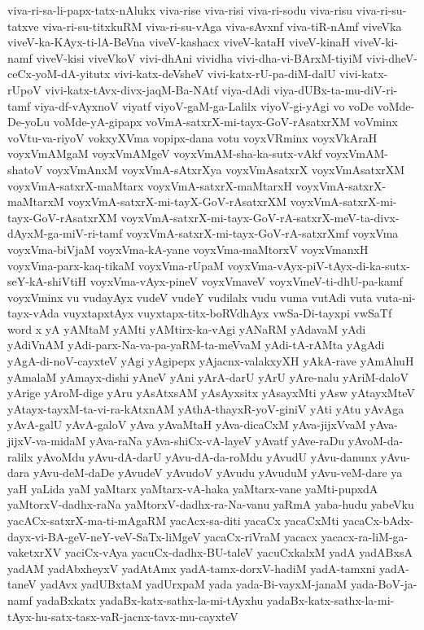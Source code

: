 {viva-ri-sa-li-papx-tatx-nAlukx
viva-rise
viva-risi
viva-ri-sodu
viva-risu
viva-ri-su-tatxve
viva-ri-su-titxkuRM
viva-ri-su-vAga
viva-sAvxnf
viva-tiR-nAmf
viveVka
viveV-ka-KAyx-ti-lA-BeVna
viveV-kashacx
viveV-kataH
viveV-kinaH
viveV-ki-namf
viveV-kisi
viveVkoV
vivi-dhAni
vividha
vivi-dha-vi-BArxM-tiyiM
vivi-dheV-ceCx-yoM-dA-yitutx
vivi-katx-deVsheV
vivi-katx-rU-pa-diM-dalU
vivi-katx-rUpoV
vivi-katx-tAvx-divx-jaqM-Ba-NAtf
viya-dAdi
viya-dUBx-ta-mu-diV-ri-tamf
viya-df-vAyxnoV
viyatf
viyoV-gaM-ga-Lalilx
viyoV-gi-yAgi
vo
voDe
voMde-De-yoLu
voMde-yA-gipapx
voVmA-satxrX-mi-tayx-GoV-rAsatxrXM
voVminx
voVtu-va-riyoV
vokxyXVma
vopipx-dana
votu
voyxVRminx
voyxVkAraH
voyxVmAMgaM
voyxVmAMgeV
voyxVmAM-sha-ka-sutx-vAkf
voyxVmAM-shatoV
voyxVmAnxM
voyxVmA-sAtxrXya
voyxVmAsatxrX
voyxVmAsatxrXM
voyxVmA-satxrX-maMtarx
voyxVmA-satxrX-maMtarxH
voyxVmA-satxrX-maMtarxM
voyxVmA-satxrX-mi-tayX-GoV-rAsatxrXM
voyxVmA-satxrX-mi-tayx-GoV-rAsatxrXM
voyxVmA-satxrX-mi-tayx-GoV-rA-satxrX-meV-ta-divx-dAyxM-ga-miV-ri-tamf
voyxVmA-satxrX-mi-tayx-GoV-rA-satxrXmf
voyxVma
voyxVma-biVjaM
voyxVma-kA-yane
voyxVma-maMtorxV
voyxVmanxH
voyxVma-parx-kaq-tikaM
voyxVma-rUpaM
voyxVma-vAyx-piV-tAyx-di-ka-sutx-seY-kA-shiVtiH
voyxVma-vAyx-pineV
voyxVmaveV
voyxVmeV-ti-dhU-pa-kamf
voyxVminx
vu
vudayAyx
vudeV
vudeY
vudilalx
vudu
vuma
vutAdi
vuta
vuta-ni-tayx-vAda
vuyxtapxtAyx
vuyxtapx-titx-boRVdhAyx
vwSa-Di-tayxpi
vwSaTf
word
x
yA
yAMtaM
yAMti
yAMtirx-ka-vAgi
yANaRM
yAdavaM
yAdi
yAdiVnAM
yAdi-parx-Na-va-pa-yaRM-ta-meVvaM
yAdi-tA-rAMta
yAgAdi
yAgA-di-noV-cayxteV
yAgi
yAgipepx
yAjacnx-valakxyXH
yAkA-rave
yAmAhuH
yAmalaM
yAmayx-dishi
yAneV
yAni
yArA-darU
yArU
yAre-nalu
yAriM-daloV
yArige
yAroM-dige
yAru
yAsAtxsAM
yAsAyxsitx
yAsayxMti
yAsw
yAtayxMteV
yAtayx-tayxM-ta-vi-ra-kAtxnAM
yAthA-thayxR-yoV-giniV
yAti
yAtu
yAvAga
yAvA-galU
yAvA-galoV
yAva
yAvaMtaH
yAva-dicaCxM
yAva-jijxVvaM
yAva-jijxV-va-midaM
yAva-raNa
yAva-shiCx-vA-layeV
yAvatf
yAve-raDu
yAvoM-da-ralilx
yAvoMdu
yAvu-dA-darU
yAvu-dA-da-roMdu
yAvudU
yAvu-danunx
yAvu-dara
yAvu-deM-daDe
yAvudeV
yAvudoV
yAvudu
yAvuduM
yAvu-veM-dare
ya
yaH
yaLida
yaM
yaMtarx
yaMtarx-vA-haka
yaMtarx-vane
yaMti-pupxdA
yaMtorxV-dadhx-raNa
yaMtorxV-dadhx-ra-Na-vanu
yaRmA
yaba-hudu
yabeVku
yacACx-satxrX-ma-ti-mAgaRM
yacAcx-sa-diti
yacaCx
yacaCxMti
yacaCx-bAdx-dayx-vi-BA-geV-neY-veV-SaTx-liMgeV
yacaCx-riVraM
yacacx
yacacx-ra-liM-ga-vaketxrXV
yaciCx-vAya
yacuCx-dadhx-BU-taleV
yacuCxkalxM
yadA
yadABxsA
yadAM
yadAbxheyxV
yadAtAmx
yadA-tamx-dorxV-hadiM
yadA-tamxni
yadA-taneV
yadAvx
yadUBxtaM
yadUrxpaM
yada
yada-Bi-vayxM-janaM
yada-BoV-ja-namf
yadaBxkatx
yadaBx-katx-sathx-la-mi-tAyxhu
yadaBx-katx-sathx-la-mi-tAyx-hu-satx-tasx-vaR-jacnx-tavx-mu-cayxteV
}
